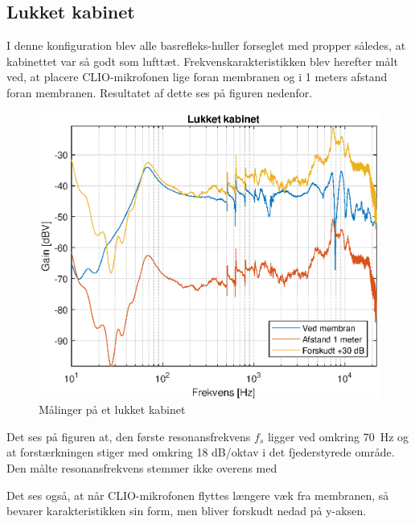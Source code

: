 \subsection{Lukket kabinet}
I denne konfiguration blev alle basrefleks-huller forseglet med propper således, at kabinettet var så godt som lufttæt. Frekvenskarakteristikken blev herefter målt ved, at placere CLIO-mikrofonen lige foran membranen og i 1 meters afstand foran membranen. Resultatet af dette ses på figuren nedenfor.
\begin{figure}[H]
	\centering
	\includegraphics[width=\textwidth]{Pics/Graph}
	\caption{Målinger på et lukket kabinet}
\end{figure}

Det ses på figuren at, den første resonansfrekvens $f_s$ ligger ved omkring \SI{70}{\hertz} og at forstærkningen stiger med omkring 18 dB/oktav i det fjederstyrede område. Den målte resonansfrekvens stemmer ikke overens med 

Det ses også, at når CLIO-mikrofonen flyttes længere væk fra membranen, så bevarer karakteristikken sin form, men bliver forskudt nedad på y-aksen.